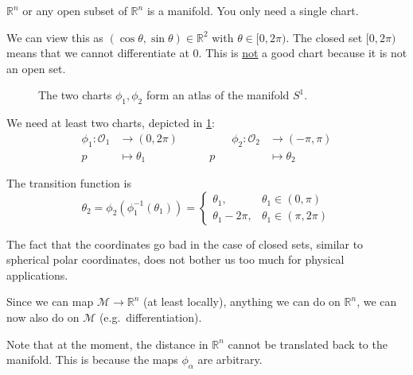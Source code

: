 \begin{example}[$\mathbb{R}^n$]
  $\mathbb{R}^n$ or any open subset of $\mathbb{R}^n$ is a manifold. You only need a single chart.
\end{example}

\begin{example}[$S^1$]
  We can view this as $(\cos \theta, \sin \theta) \in \mathbb{R}^{2}$ with $\theta \in [0, 2\pi)$. The closed set $[0, 2\pi)$ means that we cannot differentiate at $0$. This is \underline{not} a good chart because it is not an open set. 
  \begin{figure}[htpb]
    \centering
    \def\svgwidth{0.8\columnwidth}
    
    \caption{The two charts $\phi_1, \phi_2$ form an atlas of the manifold $S^1$.}
    \label{fig:L1F2}
  \end{figure}

  We need at least two charts, depicted in \ref{fig:L1F2}:
  \begin{equation}
    \begin{alignedat}{2}
      \phi_1 \colon \mathcal{O}_1 &\to (0, 2\pi)  \qquad&\qquad
      \phi_2 \colon \mathcal{O}_2 &\to (-\pi, \pi) \\
      p &\mapsto \theta_1 &
      p &\mapsto \theta_2
    \end{alignedat}
  \end{equation}

  The transition function is 
  \begin{equation}
    \theta_2 = \phi_2(\phi_1^{-1}(\theta_1)) = 
    \begin{cases}
      \theta_1, & \theta_1 \in (0, \pi) \\
      \theta_1 - 2\pi, & \theta_1 \in (\pi, 2\pi)
    \end{cases}
  \end{equation}
\begin{leftbar}
  \begin{remark}
    The fact that the coordinates go bad in the case of closed sets, similar to spherical polar coordinates, does not bother us too much for physical applications.
  \end{remark}
\end{leftbar}
\end{example}

Since we can map $\mathcal{M} \to \mathbb{R}^n$ (at least locally), anything we can do on $\mathbb{R}^n$, we can now also do on $\mathcal{M}$ (e.g.~differentiation).

\begin{leftbar}
  \begin{remark}
    Note that at the moment, the distance in $\mathbb{R}^n$ cannot be translated back to the manifold. This is because the maps $\phi_\alpha$ are arbitrary.
  \end{remark}
\end{leftbar}

